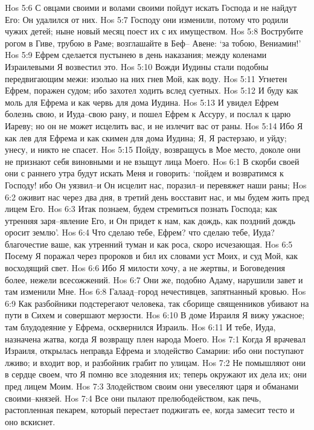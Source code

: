 Hos 5:6  С овцами своими и волами своими пойдут искать Господа и не найдут Его: Он удалился от них.
Hos 5:7  Господу они изменили, потому что родили чужих детей; ныне новый месяц поест их с их имуществом.
Hos 5:8  Вострубите рогом в Гиве, трубою в Раме; возглашайте в Беф-- Авене: `за тобою, Вениамин!'
Hos 5:9  Ефрем сделается пустынею в день наказания; между коленами Израилевыми Я возвестил это.
Hos 5:10  Вожди Иудины стали подобны передвигающим межи: изолью на них гнев Мой, как воду.
Hos 5:11  Угнетен Ефрем, поражен судом; ибо захотел ходить вслед суетных.
Hos 5:12  И буду как моль для Ефрема и как червь для дома Иудина.
Hos 5:13  И увидел Ефрем болезнь свою, и Иуда--свою рану, и пошел Ефрем к Ассуру, и послал к царю Иареву; но он не может исцелить вас, и не излечит вас от раны.
Hos 5:14  Ибо Я как лев для Ефрема и как скимен для дома Иудина; Я, Я растерзаю, и уйду; унесу, и никто не спасет.
Hos 5:15  Пойду, возвращусь в Мое место, доколе они не признают себя виновными и не взыщут лица Моего.
Hos 6:1  В скорби своей они с раннего утра будут искать Меня и говорить: `пойдем и возвратимся к Господу! ибо Он уязвил--и Он исцелит нас, поразил--и перевяжет наши раны;
Hos 6:2  оживит нас через два дня, в третий день восставит нас, и мы будем жить пред лицем Его.
Hos 6:3  Итак познаем, будем стремиться познать Господа; как утренняя заря--явление Его, и Он придет к нам, как дождь, как поздний дождь оросит землю'.
Hos 6:4  Что сделаю тебе, Ефрем? что сделаю тебе, Иуда? благочестие ваше, как утренний туман и как роса, скоро исчезающая.
Hos 6:5  Посему Я поражал через пророков и бил их словами уст Моих, и суд Мой, как восходящий свет.
Hos 6:6  Ибо Я милости хочу, а не жертвы, и Боговедения более, нежели всесожжений.
Hos 6:7  Они же, подобно Адаму, нарушили завет и там изменили Мне.
Hos 6:8  Галаад--город нечестивцев, запятнанный кровью.
Hos 6:9  Как разбойники подстерегают человека, так сборище священников убивают на пути в Сихем и совершают мерзости.
Hos 6:10  В доме Израиля Я вижу ужасное; там блудодеяние у Ефрема, осквернился Израиль.
Hos 6:11  И тебе, Иуда, назначена жатва, когда Я возвращу плен народа Моего.
Hos 7:1  Когда Я врачевал Израиля, открылась неправда Ефрема и злодейство Самарии: ибо они поступают лживо; и входит вор, и разбойник грабит по улицам.
Hos 7:2  Не помышляют они в сердце своем, что Я помню все злодеяния их; теперь окружают их дела их; они пред лицем Моим.
Hos 7:3  Злодейством своим они увеселяют царя и обманами своими--князей.
Hos 7:4  Все они пылают прелюбодейством, как печь, растопленная пекарем, который перестает поджигать ее, когда замесит тесто и оно вскиснет.
